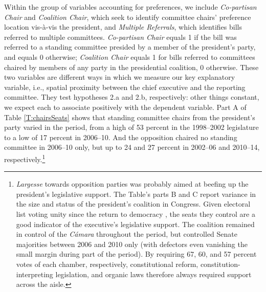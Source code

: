 \documentclass[letter,12pt]{article}
\begin{document}
Within the group of variables accounting for preferences, we include \emph{Co-partisan Chair} and \emph{Coalition Chair}, which seek to identify committee chairs' preference location vis-\`a-vis the president, and \emph{Multiple Referrals}, which identifies bills referred to multiple committees. \emph{Co-partisan Chair} equals 1 if the bill was referred to a standing committee presided by a member of the president's party, and equals 0 otherwise; \emph{Coalition Chair} equals 1 for bills referred to committees chaired by members of any party in the presidential coalition, 0 otherwise. These two variables are different ways in which we measure our key explanatory variable, i.e., spatial proximity between the chief executive and the reporting committee. They test hypotheses 2.a and 2.b, respectively: other things constant, we expect each to associate positively with the dependent variable. Part A of Table \ref{T:chairsSeats} shows that standing committee chairs from the president's party varied in the period, from a high of 53 percent in the 1998--2002 legislature to a low of 17 percent in 2006--10. And the opposition chaired no standing committee in 2006--10 only, but up to 24 and 27 percent in 2002--06 and 2010--14, respectively.\footnote{\emph{Largesse} towards opposition parties was probably aimed at beefing up the president's legislative support. The Table's parts B and C report variance in the size and status of the president's coalition in Congress. Given electoral list voting unity since the return to democracy \citep{carey.2002,aleman.saiegh.coalUnityChile.2007}, the seats they control are a good indicator of the executive's legislative support. The coalition remained in control of the \emph{Cámara} throughout the period, but controlled Senate majorities between 2006 and 2010 only (with defectors even vanishing the small margin during part of the period). By requiring 67, 60, and 57 percent votes of each chamber, respectively, constitutional reform, constitution-interpreting legislation, and organic laws therefore always required support across the aisle.} 
\end{document}
